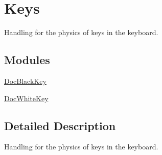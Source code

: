 \hypertarget{group___keys}{}\section{Keys}
\label{group___keys}


Handling for the physics of keys in the keyboard.  


\subsection*{Modules}
\begin{DoxyCompactItemize}
\item 
\hyperlink{group___doc_black_key}{Doc\+Black\+Key}
\begin{DoxyCompactList}\small\item\em \end{DoxyCompactList}\item 
\hyperlink{group___doc_white_key}{Doc\+White\+Key}
\begin{DoxyCompactList}\small\item\em \end{DoxyCompactList}\end{DoxyCompactItemize}


\subsection{Detailed Description}
Handling for the physics of keys in the keyboard. 

